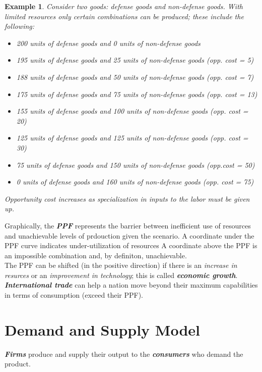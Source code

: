 \documentclass{article}
\newtheorem{example}{Example}[section]
\newcommand{\define}[1]{\textbf{\textit{#1}}}
\begin{document}
\begin{example}
Consider two goods: defense goods and non-defense goods. With limited resources only certain combinations can be produced; these include the following:
  \begin{itemize}
    \item[A] 200 units of defense goods and 0 units of non-defense goods
    \item[B] 195 units of defense goods and 25 units of non-defense goods (opp. cost = 5)
    \item[C] 188 units of defense goods and 50 units of non-defense goods (opp. cost = 7) 
    \item[D] 175 units of defense goods and 75 units of non-defense goods (opp. cost = 13)
    \item[E] 155 units of defense goods and 100 units of non-defense goods (opp. cost = 20)
    \item[F] 125 units of defense goods and 125 units of non-defense goods (opp. cost = 30)
    \item[G] 75 units of defense goods and 150 units of non-defense goods (opp.cost = 50)
    \item[H] 0 units of defense goods and 160 units of non-defense goods (opp. cost = 75)
  \end{itemize}
\emph{Opportunity cost increases} as specialization in inputs to the labor must be given up. 
\end{example}

Graphically, the \define{PPF} represents the barrier between inefficient use of resources and unachievable levels of prdouction given the scenario. A coordinate under the PPF curve indicates under-utilization of resources A coordinate above the PPF is an impossible combination and, by definiton, unachievable. \\

The PPF can be shifted (in the positive direction) if there is an \emph{increase in resurces} or an \emph{improvement in technology}; this is called \define{economic growth}. \define{International trade} can help a nation move beyond their maximum capabilities in terms of consumption (exceed their PPF). 

\section{Demand and Supply Model}

\define{Firms} produce and supply their output to the \define{consumers} who demand the product. 
\end{document}

